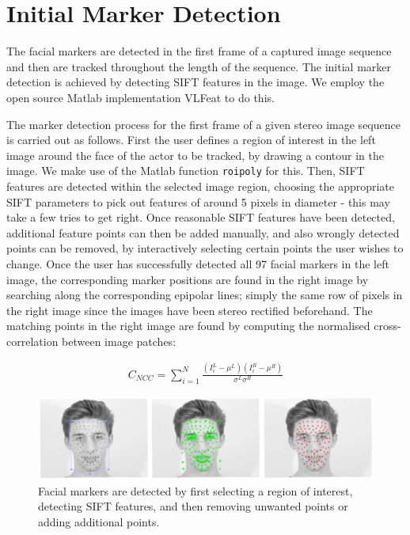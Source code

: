 \section{Initial Marker Detection}

The facial markers are detected in the first frame of a captured image sequence and then are tracked throughout the length of the sequence. The initial marker detection is achieved by detecting SIFT features in the image. We employ the open source Matlab implementation VLFeat \cite{vedaldi08vlfeat} to do this. 

The marker detection process for the first frame of a given stereo image sequence is carried out as follows. First the user defines a region of interest in the left image around the face of the actor to be tracked, by drawing a contour in the image. We make use of the Matlab function \texttt{roipoly} for this. Then, SIFT features are detected within the selected image region, choosing the appropriate SIFT parameters to pick out features of around 5 pixels in diameter - this may take a few tries to get right. Once reasonable SIFT features have been detected, additional feature points can then be added manually, and also wrongly detected points can be removed, by interactively selecting certain points the user wishes to change. Once the user has successfully detected all 97 facial markers in the left image, the corresponding marker positions are found in the right image by searching along the corresponding epipolar lines; simply the same row of pixels in the right image since the images have been stereo rectified beforehand. The matching points in the right image are found by computing the normalised cross-correlation between image patches:

\begin{equation}
\begin{aligned}
	C_{NCC} = \sum_{i=1}^N \frac{(I_i^L - \mu^L)(I_i^R - \mu^R)}{\sigma^L \sigma^R}
\end{aligned}
\end{equation}

\begin{figure}[htbp!]
\centering
\includegraphics[width=\textwidth]{img/detection}
	\caption{Facial markers are detected by first selecting a region of interest, detecting SIFT features, and then removing unwanted points or adding additional points.}
	\label{fig:detection}
\end{figure}

